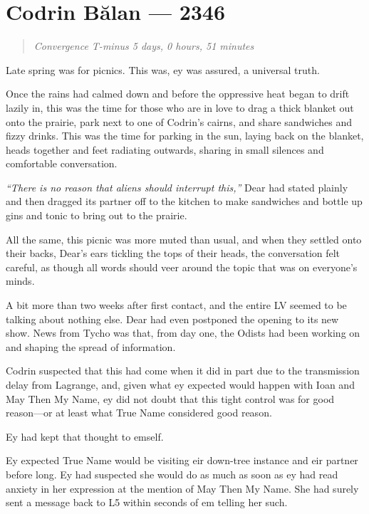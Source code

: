\hypertarget{codrin-bux103lan-2346}{%
\chapter{Codrin Bălan — 2346}}

\begin{quote}
\emph{Convergence T-minus 5 days, 0 hours, 51 minutes}
\end{quote}

\noindent Late spring was for picnics. This was, ey was assured, a universal truth.

Once the rains had calmed down and before the oppressive heat began to drift lazily in, this was the time for those who are in love to drag a thick blanket out onto the prairie, park next to one of Codrin's cairns, and share sandwiches and fizzy drinks. This was the time for parking in the sun, laying back on the blanket, heads together and feet radiating outwards, sharing in small silences and comfortable conversation.

\emph{``There is no reason that aliens should interrupt this,''} Dear had stated plainly and then dragged its partner off to the kitchen to make sandwiches and bottle up gins and tonic to bring out to the prairie.

All the same, this picnic was more muted than usual, and when they settled onto their backs, Dear's ears tickling the tops of their heads, the conversation felt careful, as though all words should veer around the topic that was on everyone's minds.

A bit more than two weeks after first contact, and the entire LV seemed to be talking about nothing else. Dear had even postponed the opening to its new show. News from Tycho was that, from day one, the Odists had been working on and shaping the spread of information.

Codrin suspected that this had come when it did in part due to the transmission delay from Lagrange, and, given what ey expected would happen with Ioan and May Then My Name, ey did not doubt that this tight control was for good reason—or at least what True Name considered good reason.

Ey had kept that thought to emself.

Ey expected True Name would be visiting eir down-tree instance and eir partner before long. Ey had suspected she would do as much as soon as ey had read anxiety in her expression at the mention of May Then My Name. She had surely sent a message back to L5 within seconds of em telling her such.

